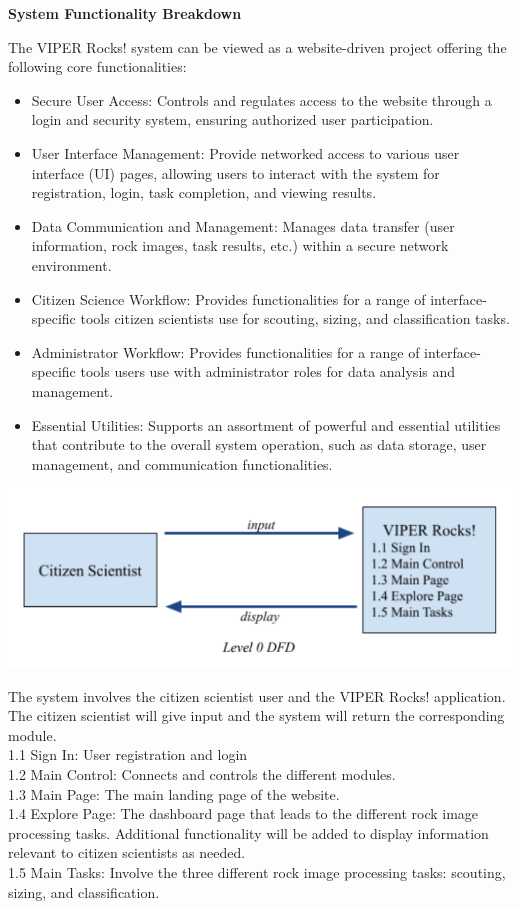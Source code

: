 \documentclass{article}
\begin{document}
\textbf{System Functionality Breakdown}

The VIPER Rocks! system can be viewed as a website-driven project offering the following core functionalities:
\begin{itemize}
	\item Secure User Access: Controls and regulates access to the website through a login and security system, ensuring authorized user participation.
	\item User Interface Management: Provide networked access to various user interface (UI) pages, allowing users to interact with the system for registration, login, task completion, and viewing results.
	\item Data Communication and Management: Manages data transfer (user information, rock images, task results, etc.) within a secure network environment.
	\item Citizen Science Workflow: Provides functionalities for a range of interface-specific tools citizen scientists use for scouting, sizing, and classification tasks.
	\item Administrator Workflow: Provides functionalities for a range of interface-specific tools users use with administrator roles for data analysis and management.
	\item Essential Utilities: Supports an assortment of powerful and essential utilities that contribute to the overall system operation, such as data storage, user management, and communication functionalities.
\end{itemize}
\includegraphics{DFD_0}

The system involves the citizen scientist user and the VIPER Rocks! application. The citizen scientist will give input and the system will return the corresponding module. \\
1.1 Sign In: User registration and login \\
1.2 Main Control: Connects and controls the different modules. \\
1.3 Main Page: The main landing page of the website. \\
1.4 Explore Page: The dashboard page that leads to the different rock image processing tasks. Additional functionality will be added to display information relevant to citizen scientists as needed. \\
1.5 Main Tasks: Involve the three different rock image processing tasks: scouting, sizing, and classification. \\
\end{document}
